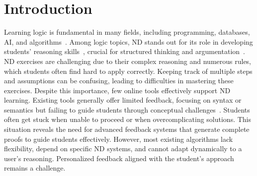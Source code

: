 
\section{Introduction}

Learning logic is fundamental in many fields, including programming, databases, AI, and algorithms~\cite{logicincomputer}. Among logic topics, ND stands out for its role in developing students’ reasoning skills~\cite{IJCAI13}, crucial for structured thinking and argumentation~\cite{vonPlato_2014}. ND exercises are challenging due to their complex reasoning and numerous rules, which students often find hard to apply correctly. Keeping track of multiple steps and assumptions can be confusing, leading to difficulties in mastering these exercises.
Despite this importance, few online tools effectively support ND learning. Existing tools generally offer limited feedback, focusing on syntax or semantics but failing to guide students through conceptual challenges~\cite{Perh__2025}. Students often get stuck when unable to proceed or when overcomplicating solutions. This situation reveals the need for advanced feedback systems that generate complete proofs to guide students effectively. However, most existing algorithms lack flexibility, depend on specific ND systems, and cannot adapt dynamically to a user’s reasoning. Personalized feedback aligned with the student’s approach remains a challenge.

